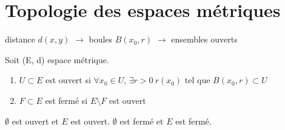 \documentclass[a4paper]{report}
\renewcommand\O{\ensuremath{\emptyset}}
\theoremstyle{definition}
\begin{document}
\section{Topologie des espaces métriques}
distance $d(x, y)$ $\longrightarrow$ boules  $B(x_0, r)$ $\longrightarrow$ ensembles ouverts
\begin{definition}
    Soit (E, d) espace métrique.
    \begin{enumerate}
        \item $U \subset E$ est ouvert si $\forall x_0 \in U, \, \exists r > 0 \: r(x_0)$ tel que $B(x_0, r) \subset U$
        \item $F \subset E$ est fermé si $E \setminus F$ est ouvert
    \end{enumerate}
    $\O$ est ouvert et $E$ est ouvert.  $\O$ est fermé et $E$ est fermé.
\end{definition}
\end{document}
